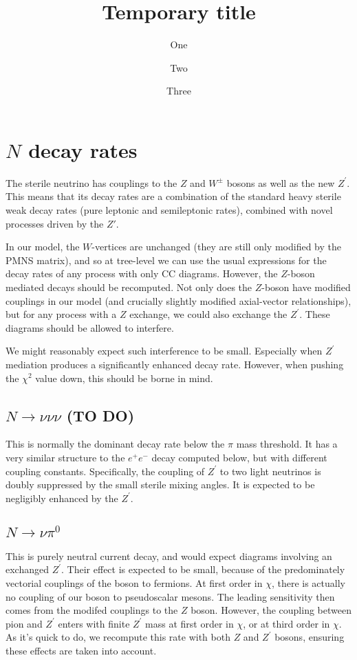 \documentclass[11pt, a4paper]{article}
\title{Temporary title}
\author{One}
\author{Two}
\author{Three}
\affiliation{Institute for Particle Physics Phenomenology, Department of
Physics, Durham University, South Road, Durham DH1 3LE, United Kingdom}
\begin{document}
 


\section{$N$ decay rates}

The sterile neutrino has couplings to the $Z$ and $W^\pm$ bosons as well as the
new $Z^\prime$. This means that its decay rates are a combination of the
standard heavy sterile weak decay rates (pure leptonic and semileptonic rates),
combined with novel processes driven by the $Z\prime$. 

In our model, the $W$-vertices are unchanged (they are still only modified by
the PMNS matrix), and so at tree-level we can use the usual expressions for the
decay rates of any process with only CC diagrams. However, the $Z$-boson mediated 
decays should be recomputed. Not only does the $Z$-boson have
modified couplings in our model (and crucially slightly modified axial-vector
relationships), but for any process with a $Z$ exchange, we could also exchange
the $Z^\prime$. These diagrams should be allowed to interfere. 

We might reasonably expect such interference to be small. Especially when
$Z^\prime$ mediation produces a significantly enhanced decay rate. However, 
when pushing the $\chi^2$ value down, this should be borne in mind.

\subsection{$N\to\nu\nu\nu$ (TO DO)}

This is normally the dominant decay rate below the $\pi$ mass threshold.  It
has a very similar structure to the $e^+e^-$ decay computed below, but with
different coupling constants.  Specifically, the coupling of $Z^\prime$ to two
light neutrinos is doubly suppressed by the small sterile mixing angles. It is
expected to be negligibly enhanced by the $Z^\prime$. 

\subsection{$N\to\nu\pi^0$}

This is purely neutral current decay, and would expect diagrams involving an
exchanged $Z^\prime$.
%
Their effect is expected to be small, because of the predominately vectorial
couplings of the boson to fermions. At first order in $\chi$, there is actually
no coupling of our boson to pseudoscalar mesons. The leading sensitivity then
comes from the modifed couplings to the $Z$ boson. However, the coupling
between pion and $Z^\prime$ enters with finite $Z^\prime$ mass at first order
in $\chi$, or at third order in $\chi$. As it's quick to do, we recompute this
rate with both $Z$ and $Z^\prime$ bosons, ensuring these effects are taken into
account.
\end{document}
